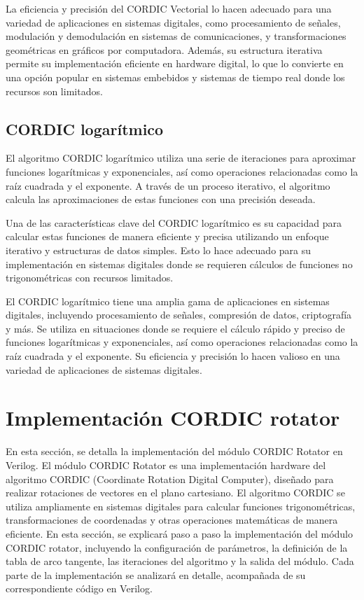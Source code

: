 \documentclass[12pt,a4paper, twoside]{article} %
\begin{document}
La eficiencia y precisión del CORDIC Vectorial lo hacen adecuado para una variedad de aplicaciones en sistemas digitales, como procesamiento de señales, modulación y demodulación en sistemas de comunicaciones, y transformaciones geométricas en gráficos por computadora. Además, su estructura iterativa permite su implementación eficiente en hardware digital, lo que lo convierte en una opción popular en sistemas embebidos y sistemas de tiempo real donde los recursos son limitados.


\subsection{CORDIC logarítmico}
\label{sec:orgdaca22c}

El algoritmo CORDIC logarítmico utiliza una serie de iteraciones para aproximar funciones logarítmicas y exponenciales, así como operaciones relacionadas como la raíz cuadrada y el exponente. A través de un proceso iterativo, el algoritmo calcula las aproximaciones de estas funciones con una precisión deseada.

Una de las características clave del CORDIC logarítmico es su capacidad para calcular estas funciones de manera eficiente y precisa utilizando un enfoque iterativo y estructuras de datos simples. Esto lo hace adecuado para su implementación en sistemas digitales donde se requieren cálculos de funciones no trigonométricas con recursos limitados.

El CORDIC logarítmico tiene una amplia gama de aplicaciones en sistemas digitales, incluyendo procesamiento de señales, compresión de datos, criptografía y más. Se utiliza en situaciones donde se requiere el cálculo rápido y preciso de funciones logarítmicas y exponenciales, así como operaciones relacionadas como la raíz cuadrada y el exponente. Su eficiencia y precisión lo hacen valioso en una variedad de aplicaciones de sistemas digitales.




\section{Implementación CORDIC rotator}
\label{sec:orgc1c4017}

En esta sección, se detalla la implementación del módulo CORDIC Rotator en Verilog. El módulo CORDIC Rotator es una implementación hardware del algoritmo CORDIC (Coordinate Rotation Digital Computer), diseñado para realizar rotaciones de vectores en el plano cartesiano. El algoritmo CORDIC se utiliza ampliamente en sistemas digitales para calcular funciones trigonométricas, transformaciones de coordenadas y otras operaciones matemáticas de manera eficiente. En esta sección, se explicará paso a paso la implementación del módulo CORDIC rotator, incluyendo la configuración de parámetros, la definición de la tabla de arco tangente, las iteraciones del algoritmo y la salida del módulo. Cada parte de la implementación se analizará en detalle, acompañada de su correspondiente código en Verilog.
\end{document}

